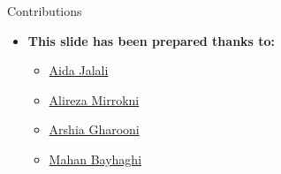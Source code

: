 \documentclass[serif, aspectratio=169]{beamer}
\begin{document}
    \begin{frame}{Contributions}
        \begin{itemize}
            \item \textbf{This slide has been prepared thanks to:}
            \begin{itemize}
                \setlength{\itemsep}{10pt} %
                \item \href{https://github.com/AidaJalali}{Aida Jalali}
                \item \href{https://github.com/alirezamirrokni}{Alireza Mirrokni}
                \item \href{https://silentdrift.github.io/}{Arshia Gharooni}
                \item \href{https://github.com/Mahan-Bayhaghi}{Mahan Bayhaghi}


            \end{itemize}
        \end{itemize}

    \end{frame}

    \begin{frame}[allowframebreaks]
        
        
        \nocite{*}
    \end{frame}
\end{document}
